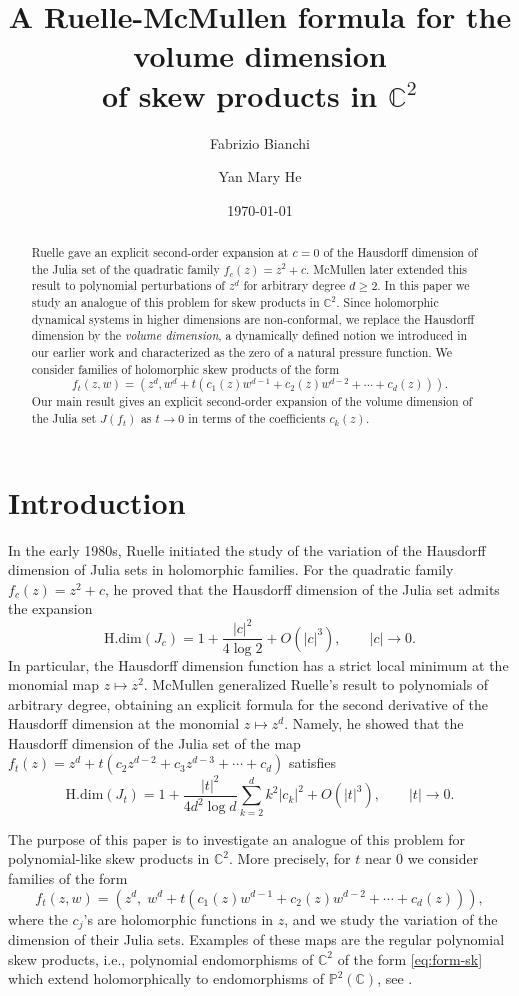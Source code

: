 \documentclass[11pt]{amsart}
\title{A Ruelle-McMullen formula for the
 volume dimension\\
  of skew products in $\mathbb C^2$}
\author{Fabrizio Bianchi}
\author{Yan Mary He}
\date{\today}
\theoremstyle{plain}
\theoremstyle{definition}
\theoremstyle{remark}
\begin{document}
\begin{abstract}
Ruelle gave an explicit second-order expansion at $c=0$
of the Hausdorff dimension of the Julia set of the quadratic family
$f_c(z)=z^2+c$.
McMullen later extended this result to polynomial perturbations of
$z^d$
 for 
arbitrary degree $d\geq 2$.
In this paper we study an analogue of this problem for
 skew products in
$\mathbb C^2$.
Since holomorphic dynamical systems in higher dimensions are non-conformal, we replace the
Hausdorff dimension by the \emph{volume dimension}, a dynamically defined notion
we introduced in our earlier work and characterized as the zero of a natural pressure function.
We consider families of holomorphic skew products of the form
\[
f_t(z,w)=(z^d,
 w^d+t(c_1 (z) w^{d-1} +c_2(z)w^{d-2} + \cdots+c_d(z))).
\]
Our main result gives an explicit second-order expansion of the volume dimension of the
Julia set $J(f_t)$ as $t\to0$
 in terms of the coefficients $c_k(z)$.
 \end{abstract}


\maketitle


\section{Introduction}

In the early 1980s, Ruelle \cite{Ruelle82} initiated the study of the variation of the Hausdorff
dimension of Julia sets in holomorphic families. For the quadratic family
$f_c(z)=z^2+c$, he proved that the Hausdorff dimension of the Julia set admits the
expansion
\[
\mathrm{H.dim}(J_c)=1+\frac{|c|^2}{4\log 2}+O(|c|^3), \qquad |c|\to0.
\]
In particular, the Hausdorff dimension function has a strict local minimum at the
monomial map $z\mapsto z^2$.
McMullen
\cite{McMullen08}
 generalized Ruelle’s result to polynomials of arbitrary degree, obtaining
an explicit formula for the second derivative of the Hausdorff dimension at the monomial
$z\mapsto z^d$. Namely, 
he showed that the Hausdorff dimension of the Julia set of the map
$f_t(z) = z^d +t(c_2z^{d-2}+c_3z^{d-3}+\cdots+c_d)$
satisfies
\[ \mathrm{H.dim} (J_t) = 1 + \frac{ |t|^2}{4d^2\log d}
\sum_{k=2}^dk^2|c_k|^2 + O(|t|^3), \qquad |t|\to0.\] 

The purpose of this paper is to investigate an analogue of this problem for
polynomial-like 
skew products in
$\mathbb C^2$.
More precisely, for $t$ near $0$ we consider families of the form
\begin{equation}\label{eq:form-sk}
f_t(z,w)=(z^d,\; w^d+t(c_1 (z) w^{d-1} + c_2(z)w^{d-2}+\cdots+c_d(z))),
\end{equation}
where the $c_j$'s are holomorphic functions in $z$,
and we study the variation of the dimension of their Julia sets. Examples of these maps
are the
regular polynomial skew products,
 i.e., polynomial endomorphisms
 of $\mathbb C^2$ of the form \eqref{eq:form-sk} 
 which extend 
 holomorphically to
 endomorphisms
of $\mathbb P^2(\mathbb C)$, see \cite{BedfordJonsson,Jonsson99}.
\end{document}
